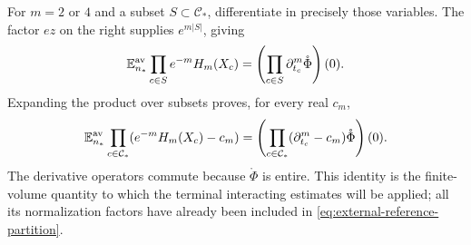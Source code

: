 For $m=2$ or $4$ and a subset $S\subset\mathcal C_*$,
differentiate in precisely those variables. The
factor $ez$ on the right supplies $e^{m|S|}$, giving
\[
 \mathbb E_{n_*}^{\mathrm{av}}\prod_{c\in S}e^{-m}H_m(X_c)
         =\left(\prod_{c\in S}\partial_{t_c}^m
                                      \mathring\Phi\right)(0).
\]
Expanding the product over subsets proves, for
every real $c_m$,
\begin{equation}\label{eq:external-Wick-product}
 \mathbb E_{n_*}^{\mathrm{av}}
        \prod_{c\in\mathcal C_*}(e^{-m}H_m(X_c)-c_m)
     =\left(\prod_{c\in\mathcal C_*}
                (\partial_{t_c}^m-c_m)\mathring\Phi\right)(0).
\end{equation}
The derivative operators commute because
$\mathring\Phi$ is entire. This identity is the
finite-volume quantity to which the terminal
interacting estimates will be applied; all its
normalization factors have already been included
in \eqref{eq:external-reference-partition}.


